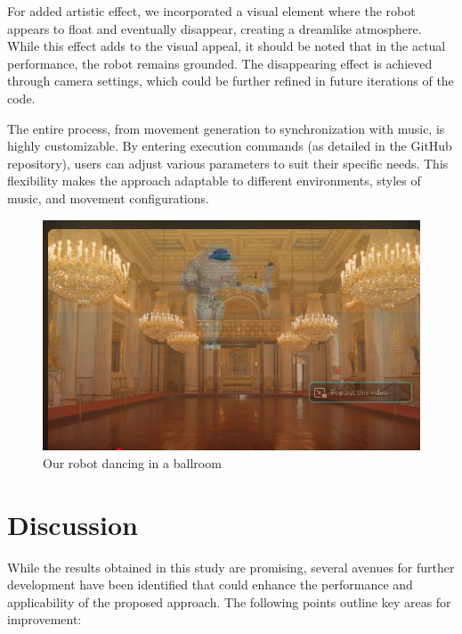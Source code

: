 \documentclass{amsart}
\theoremstyle{definition}
\theoremstyle{plain}
\begin{document}
For added artistic effect, we incorporated a visual element where the robot appears to float and eventually disappear, creating a dreamlike atmosphere. 
While this effect adds to the visual appeal, it should be noted that in the actual performance, the robot remains grounded. 
The disappearing effect is achieved through camera settings, which could be further refined in future iterations of the code.

The entire process, from movement generation to synchronization with music, is highly customizable. By entering execution commands (as detailed in the GitHub repository), users can adjust various parameters to suit their specific needs. 
This flexibility makes the approach adaptable to different environments, styles of music, and movement configurations.

\begin{figure}
  \includegraphics[width = 0.7 \columnwidth]{img/ball.png}
  \caption{Our robot dancing in a ballroom}\label{fig:ballroom}
\end{figure}


\section{Discussion}

While the results obtained in this study are promising, several avenues for further development have been identified that could enhance the performance and applicability of the proposed approach. 
The following points outline key areas for improvement:
\end{document}
